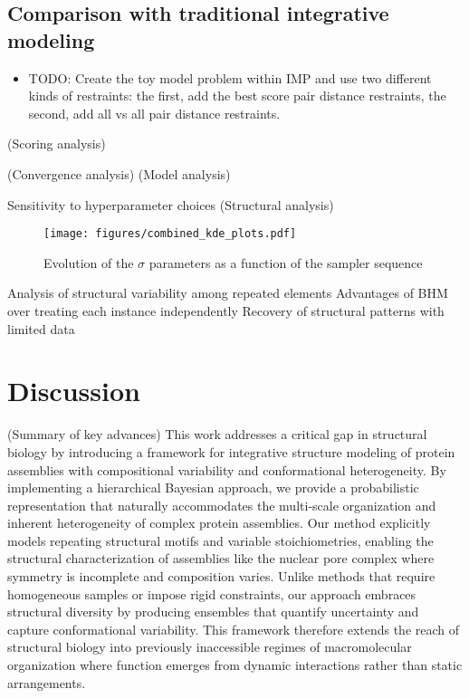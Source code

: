 \documentclass[journal=jcim,manuscript=article]{achemso}
\begin{document}
\subsection{Comparison with traditional integrative modeling}
\begin{itemize}
\item TODO: Create the toy model problem within IMP and use two different kinds of restraints:
the first, add the best score pair distance restraints, the second, add all vs all pair distance 
restraints.
\end{itemize}
(Scoring analysis)

(Convergence analysis)
(Model analysis)

Sensitivity to hyperparameter choices
(Structural analysis)
\begin{figure}
    \centering
    \texttt{[image: figures/combined\_kde\_plots.pdf]}
    \caption{Evolution of the $\sigma$ parameters as a function of the sampler sequence}
    \label{fig:enter-label}
\end{figure}
Analysis of structural variability among repeated elements
Advantages of BHM over treating each instance independently
Recovery of structural patterns with limited data

\section{Discussion}
(Summary of key advances) This work addresses a critical gap in structural biology by introducing a framework for integrative structure modeling of protein assemblies with compositional variability and conformational heterogeneity. By implementing a hierarchical Bayesian approach, we provide a probabilistic representation that naturally accommodates the multi-scale organization and inherent heterogeneity of complex protein assemblies. Our method explicitly models repeating structural motifs and variable stoichiometries, enabling the structural characterization of assemblies like the nuclear pore complex where symmetry is incomplete and composition varies. Unlike methods that require homogeneous samples or impose rigid constraints, our approach embraces structural diversity by producing ensembles that quantify uncertainty and capture conformational variability. This framework therefore extends the reach of structural biology into previously inaccessible regimes of macromolecular organization where function emerges from dynamic interactions rather than static arrangements.
\end{document}
